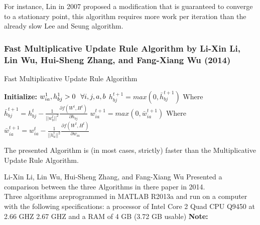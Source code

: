 \documentclass{beamer}
\begin{document}
\begin{spacing}{1.0}
\begin{frame}
    For instance, Lin in 2007 proposed a modification that is guaranteed to converge to a stationary point,
    this algorithm requires more work per iteration than the already slow Lee and Seung algorithm.
\end{frame}
\begin{frame}
    \begin{tcolorbox}[fit,width=\textwidth,height=.85\textheight,size=minimal,colback=white,fit algorithm=fontsize,colframe=white]
\frametitle{Fast Multiplicative Update Rule Algorithm by Li-Xin Li, Lin Wu, Hui-Sheng Zhang, and Fang-Xiang Wu (2014)}
\begin{algorithm}[H]
    \caption{Fast Multiplicative Update Rule Algorithm}
        \textbf{Initialize:} $w_{ia}^{1}, h_{bj}^{1} > 0 \hspace{0.1in}\forall i,j,a,b$\;
         {
        {$h_{bj}^{t+1} = max(0, \bar{h}_{bj}^{t+1})$\;
         Where \;
         $\bar{h}_{bj}^{t+1} = h_{bj}^{t} - \frac{1}{||w_{b}^{t}||^{2}}\frac{\partial f(W^{t},H^{t})}{\partial h_{bj}}$\;
        }
        {$w_{ia}^{t+1} = max(0, \bar{w}_{ia}^{t+1})$\;
         Where \;
         $\bar{w}_{ia}^{t+1} = w_{ia}^{t} - \frac{1}{||h_{a}^{t}||^{2}}\frac{\partial f(W^{t},H^{t})}{\partial w_{ia}}$\;
        }
        }
\end{algorithm}
\end{tcolorbox}
\end{frame}
\begin{frame}
    \begin{theorem}
        The presented Algorithm is (in most cases, strictly) faster than the Multiplicative Update Rule
        Algorithm.
    \end{theorem}
\end{frame}
\begin{frame}
        Li-Xin Li, Lin Wu, Hui-Sheng Zhang, and Fang-Xiang Wu Presented a comparison between the three Algorithms
        in there paper in 2014.\\
        Three algorithms areprogrammed in MATLAB R2013a and run on a computer with the following specifications: 
        a processor of Intel Core 2 Quad CPU Q9450 at 2.66 GHZ 2.67 GHZ and a RAM of 4 GB (3.72 GB usable)
        \textbf{Note:}\\ 

\end{frame}
\end{spacing}
\end{document}
